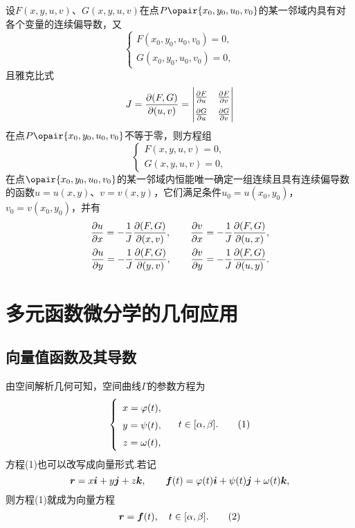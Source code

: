 \begin{theorem}[隐函数存在定理3]\label{theorem:多元函数微分法.隐函数存在定理3}
设\(F(x,y,u,v)\)、\(G(x,y,u,v)\)在点\(P\opair{x_0,y_0,u_0,v_0}\)的某一邻域内具有对各个变量的连续偏导数，又\[
\left\{ \begin{array}{c}
F(x_0,y_0,u_0,v_0)=0, \\
G(x_0,y_0,u_0,v_0)=0,
\end{array} \right.
\]且雅克比式\[
J=\jacobi{F,G}{u,v}={
\def\arraystretch{1.5}
\begin{vmatrix}
\pdv{F}{u} & \pdv{F}{v} \\
\pdv{G}{u} & \pdv{G}{v}
\end{vmatrix}
}
\]在点\(P\opair{x_0,y_0,u_0,v_0}\)不等于零，则方程组\[
\left\{ \begin{array}{c}
F(x,y,u,v)=0, \\
G(x,y,u,v)=0,
\end{array} \right.
\]在点\(\opair{x_0,y_0,u_0,v_0}\)的某一邻域内恒能唯一确定一组连续且具有连续偏导数的函数\(u=u(x,y)\)、\(v=v(x,y)\)，它们满足条件\(u_0=u(x_0,y_0)\)，\(v_0=v(x_0,y_0)\)，并有
\begin{equation}\label{equation:多元函数微分法.隐函数存在定理3.一阶偏导数}
\begin{split}
\pdv{u}{x}
= -\frac{1}{J} \pdv{(F,G)}{(x,v)},
\qquad
\pdv{v}{x}
= -\frac{1}{J} \pdv{(F,G)}{(u,x)},
\\
\pdv{u}{y}
= -\frac{1}{J} \pdv{(F,G)}{(y,v)},
\qquad
\pdv{v}{y}
= -\frac{1}{J} \pdv{(F,G)}{(u,y)}.
\end{split}
\end{equation}
\end{theorem}

\section{多元函数微分学的几何应用}
\subsection{向量值函数及其导数}
由空间解析几何可知，空间曲线\(\Gamma\)的参数方程为\begin{gather}
\left\{ \begin{array}{c}
x=\varphi(t), \\
y=\psi(t), \\
z=\omega(t),
\end{array} \right. \quad
t \in [\alpha,\beta].
\tag1
\end{gather}方程(1)也可以改写成向量形式.若记\[
\boldsymbol{r}=x\boldsymbol{i}+y\boldsymbol{j}+z\boldsymbol{k},
\qquad
\boldsymbol{f}(t)=\varphi(t)\boldsymbol{i}+\psi(t)\boldsymbol{j}+\omega(t)\boldsymbol{k},
\]则方程(1)就成为向量方程\begin{gather}
\mat{r}=\mat{f}(t), \quad t \in [\alpha,\beta].
\tag2
\end{gather}

